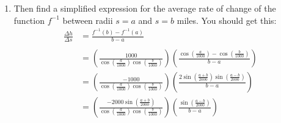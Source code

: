\documentclass{ximera}
\begin{document}
\begin{question}
\begin{enumerate}
\begin{enumerate}
\item Then find a simplified expression for the average rate of change of the function $f^{-1}$ between radii $s=a$ and $s=b$ miles. You should get this:
\begin{align*}
     \frac{\Delta h}{\Delta s} &= \frac{f^{-1}(b) - f^{-1}(a)}{b-a} \\ \\
                                          &=\left(\frac{1000}{\cos(\frac{a}{1000})\cos(\frac{b}{1000})}\right) \left( \frac{\cos(\frac{a}{1000}) - \cos(\frac{b}{1000}) }{b-a} \right) \\
                                          &= \left(\frac{-1000}{\cos(\frac{a}{1000})\cos(\frac{b}{1000})}\right)                                    \left( \frac{2\sin\left( \frac{a+b}{2000}\right)  \sin\left(\frac{a-b}{2000}\right)}{b-a}  \right)   \\
                                 &= \left(\frac{-2000 \sin\left( \frac{a+b}{2000}\right)}{\cos(\frac{a}{1000})\cos(\frac{b}{1000})}\right)                                     \left( \frac{\sin\left(\frac{a-b}{2000}\right)}{b-a}  \right)                                     
 \end{align*}


\end{enumerate}
\end{enumerate}
\end{question}
\end{document}
